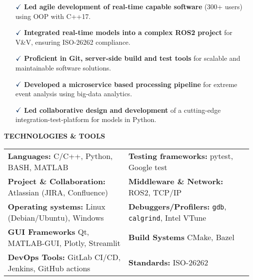 \documentclass[a4paper,10pt]{article}
\begin{document}
\vspace{0.1cm}
\begin{itemize}
    \item[$\textcolor{highlightcolor}{\checkmark}$] \textcolor{highlightcolor}{\textbf{Led agile development of real-time capable software}} (300+ users) using OOP with C++17.
    \item[$\textcolor{highlightcolor}{\checkmark}$] \textcolor{highlightcolor}{\textbf{Integrated real-time models into a complex ROS2 project}} for V\&V, ensuring ISO-26262 compliance.
    \item[$\textcolor{highlightcolor}{\checkmark}$] \textcolor{highlightcolor}{\textbf{Proficient in Git, server-side build and test tools}} for scalable and maintainable software solutions.
    \item [$\textcolor{highlightcolor}{\checkmark}$] \textcolor{highlightcolor}{\textbf{Developed a microservice based processing pipeline}} for extreme event analysis using big-data analytics.
    \item[$\textcolor{highlightcolor}{\checkmark}$] \textcolor{highlightcolor}{\textbf{Led collaborative design and development}} of a cutting-edge integration-test-platform for models in Python. 
\end{itemize}

\noindent{\rule{\linewidth}{1.4pt}}
\textbf{TECHNOLOGIES \& TOOLS}

\vspace{-0.1cm}
\noindent{\rule{\linewidth}{0.01cm}}

\vspace{-0.4cm}
\noindent
\begin{center}
    \begin{tabular}{ @{\hskip 0pt}m{} m{} }
        \textcolor{highlightcolor}{\textbf{Languages:}} C/C++, Python, BASH, MATLAB & \textcolor{highlightcolor}{\textbf{Testing frameworks:}} pytest, Google test \\ 
        \textcolor{highlightcolor}{\textbf{Project \& Collaboration:}} Atlassian (JIRA, Confluence)& \textcolor{highlightcolor}{\textbf{Middleware \& Network:}} ROS2, TCP/IP\\
        \textcolor{highlightcolor}{\textbf{Operating systems:}} Linux (Debian/Ubuntu), Windows & \textcolor{highlightcolor}{\textbf{Debuggers/Profilers:}} \verb|gdb|, \verb|calgrind|, Intel VTune \\
        \textcolor{highlightcolor}{\textbf{GUI Frameworks}} Qt, MATLAB-GUI, Plotly, Streamlit & \textcolor{highlightcolor}{\textbf{Build Systems}} CMake, Bazel\\
        \textcolor{highlightcolor}{\textbf{DevOps Tools:}} GitLab CI/CD, Jenkins, GitHub actions & \textcolor{highlightcolor}{\textbf{Standards:}} ISO-26262 \\
    \end{tabular}
\end{center}
\end{document}
